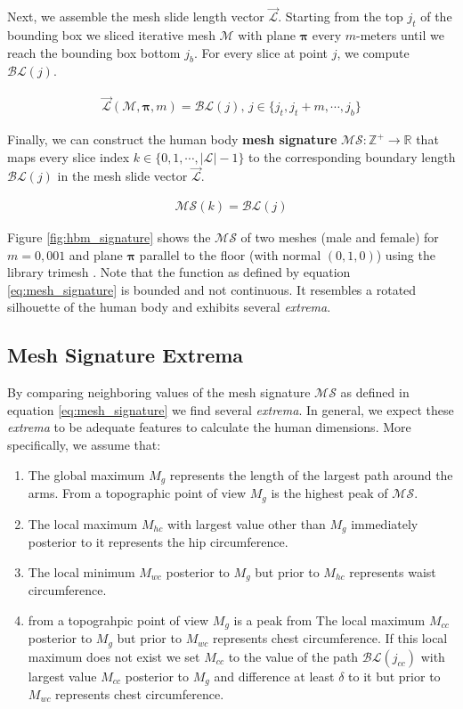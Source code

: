 \documentclass[10pt,twocolumn,letterpaper]{article}
\begin{document}
Next, we assemble the mesh slide length vector $\vec{\mathcal{L}}$. Starting 
from the 
top $j_t$ of the bounding box we sliced iterative mesh $\mathcal{M}$ with plane 
$\boldsymbol{\pi}$ every $m$-meters until we reach the bounding box bottom 
$j_b$. For every slice at point $j$, we compute $\mathcal{BL}(j)$.

\begin{align}
\vec{\mathcal{L}}(\mathcal{M}, \boldsymbol{\pi}, m) = \mathcal{BL}(j), \, j 
\in 
\{j_t, j_t+m, \cdots, j_b\}
\end{align}

Finally, we can construct the human body \textbf{mesh signature} $\mathcal{MS}: 
\mathbb{Z}^+ \to \mathbb{R}$ that maps every slice index $k \in \{0, 1, \cdots, 
|\mathcal{L}|-1\}$ to the corresponding boundary length $\mathcal{BL}(j)$ in 
the mesh slide vector $\vec{\mathcal{L}}$.

\begin{align}\label{eq:mesh_signature}
\mathcal{MS}(k) = \mathcal{BL}(j)
\end{align}

Figure \ref{fig:hbm_signature} shows the $\mathcal{MS}$ of two meshes (male 
and female) for 
$m=0,001$ and plane $\boldsymbol{\pi}$ parallel to the floor (with normal $(0, 
1,0)$) using the library trimesh \cite{trimesh}. Note that the function as 
defined by equation \ref{eq:mesh_signature} is bounded and not continuous. It 
resembles a rotated silhouette of the human body and exhibits several 
\textit{extrema}.

\subsection{Mesh Signature Extrema}

By comparing neighboring values of the mesh signature $\mathcal{MS}$ as defined 
in equation \ref{eq:mesh_signature} we find several \textit{extrema}. In 
general, we expect these \textit{extrema} to be adequate features to 
calculate the human dimensions. More specifically, we assume that:
\begin{enumerate}
	\item The global maximum $M_g$ represents the length of the largest path 
	around the arms. From a topographic point of view $M_g$ is the highest peak 
	of $\mathcal{MS}$.   
	\item The local maximum $M_{hc}$ with largest value other than $M_g$ 
	immediately posterior to it represents the hip circumference.
	\item The local minimum $M_{wc}$ posterior to $M_g$ but prior to $M_{hc}$ 
	represents waist circumference.
	\item from a topograhpic point of view $M_g$ is a peak from  	
	The local maximum $M_{cc}$ posterior to $M_g$ but prior to $M_{wc}$ 
	represents 
	chest circumference. If this local maximum does not exist we set $M_{cc}$ 
	to the value of the path $\mathcal{BL}(j_{cc})$ with largest value $M_{cc}$ 
	posterior 
	to 
	$M_g$ and difference at least $\delta$ to it but prior to $M_{wc}$	
	represents 
	chest circumference.
\end{enumerate}
\end{document}
